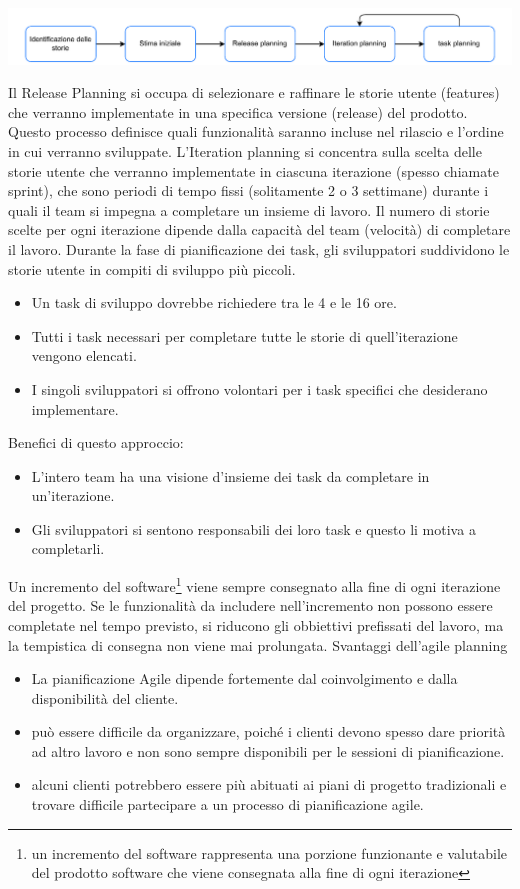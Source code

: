 \documentclass[10pt, letterpaper]{report}
\begin{document}
\begin{center}
    \includegraphics[width=1\textwidth ]{images/planningGame.pdf}
\end{center}
Il  Release Planning si occupa di selezionare e raffinare le storie utente 
(features) che verranno implementate in una specifica versione (release) del prodotto. 
Questo processo definisce quali funzionalità saranno incluse nel rilascio e l'ordine in cui 
verranno sviluppate.\acc 
L'Iteration planning si concentra sulla scelta delle storie utente che verranno implementate 
in ciascuna iterazione (spesso chiamate sprint), che sono periodi di tempo fissi 
(solitamente 2 o 3 settimane) durante i quali il team si impegna a completare un
 insieme di lavoro. Il numero di storie scelte per ogni iterazione dipende dalla capacità del 
team (velocità) di completare il lavoro.\acc 
Durante la fase di pianificazione dei task, gli sviluppatori suddividono le 
storie utente in compiti di sviluppo più piccoli.\begin{itemize}
    \item Un task di sviluppo dovrebbe richiedere tra le 4 e le 16 ore.
    \item Tutti i task necessari per completare tutte le storie di quell'iterazione vengono elencati.
    \item I singoli sviluppatori si offrono volontari per i task specifici che desiderano implementare.
\end{itemize}
Benefici di questo approccio:
\begin{itemize}
    \item L'intero team ha una visione d'insieme dei task da completare in un'iterazione.
    \item Gli sviluppatori si sentono responsabili dei loro task e questo li motiva a completarli.
\end{itemize}
Un incremento del software\footnote{
    un incremento del software rappresenta una porzione funzionante
     e valutabile del prodotto software che viene consegnata alla fine di ogni iterazione
} viene sempre consegnato alla fine di ogni iterazione del progetto.
Se le funzionalità da includere nell'incremento non possono essere completate nel tempo
 previsto, si riducono gli obbiettivi prefissati del lavoro, ma
la tempistica di consegna non viene mai prolungata.\acc
Svantaggi dell'agile planning\begin{itemize}
    \item La pianificazione Agile dipende fortemente 
    dal coinvolgimento e dalla disponibilità del cliente.
    \item può essere difficile da organizzare, poiché i  clienti devono spesso dare priorità ad
     altro lavoro e non sono sempre disponibili per le sessioni di pianificazione.
     \item alcuni clienti potrebbero essere più abituati ai piani di progetto tradizionali e trovare 
     difficile partecipare a un processo di pianificazione agile.
\end{itemize}
\end{document}
